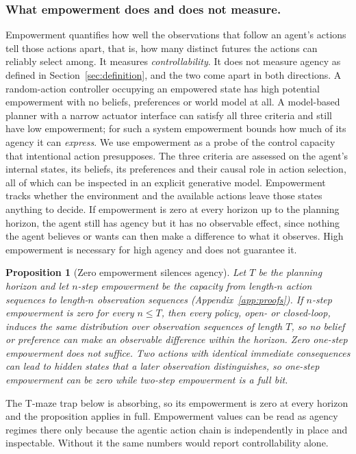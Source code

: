 \documentclass[pdflatex,sn-apa]{sn-jnl}%
\newtheorem{proposition}{Proposition}
\theoremstyle{definition}
\begin{document}
\subsubsection{What empowerment does and does not measure.}\label{sec:notagency}
Empowerment quantifies how well the observations that follow an agent's actions tell those actions apart, that is, how many distinct futures the actions can reliably select among. It measures \emph{controllability}. It does not measure agency as defined in Section~\ref{sec:definition}, and the two come apart in both directions. A random-action controller occupying an empowered state has high potential empowerment with no beliefs, preferences or world model at all. A model-based planner with a narrow actuator interface can satisfy all three criteria and still have low empowerment; for such a system empowerment bounds how much of its agency it can \emph{express}. We use empowerment as a probe of the control capacity that intentional action presupposes. The three criteria are assessed on the agent's internal states, its beliefs, its preferences and their causal role in action selection, all of which can be inspected in an explicit generative model. Empowerment tracks whether the environment and the available actions leave those states anything to decide. If empowerment is zero at every horizon up to the planning horizon, the agent still has agency but it has no observable effect, since nothing the agent believes or wants can then make a difference to what it observes. High empowerment is necessary for high agency and does not guarantee it.

\begin{proposition}[Zero empowerment silences agency]\label{prop:zero}
Let $T$ be the planning horizon and let $n$-step empowerment be the capacity from length-$n$ action sequences to length-$n$ observation sequences (Appendix~\ref{app:proofs}). If $n$-step empowerment is zero for every $n \le T$, then every policy, open- or closed-loop, induces the same distribution over observation sequences of length $T$, so no belief or preference can make an observable difference within the horizon. Zero one-step empowerment does not suffice. Two actions with identical immediate consequences can lead to hidden states that a later observation distinguishes, so one-step empowerment can be zero while two-step empowerment is a full bit.
\end{proposition}

The T-maze trap below is absorbing, so its empowerment is zero at every horizon and the proposition applies in full. Empowerment values can be read as agency regimes there only because the agentic action chain is independently in place and inspectable. Without it the same numbers would report controllability alone.
\end{document}
